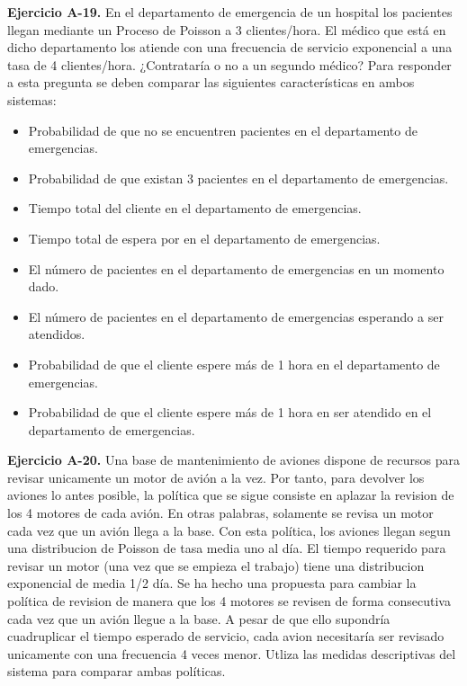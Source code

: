 \documentclass[
]{book}
\providecommand{\tightlist}{%
  \setlength{\itemsep}{0pt}\setlength{\parskip}{0pt}}
\theoremstyle{definition}
\theoremstyle{definition}
\theoremstyle{definition}
\theoremstyle{definition}
\theoremstyle{remark}
\begin{document}
\textbf{Ejercicio A-19.} En el departamento de emergencia de un hospital los pacientes llegan mediante un Proceso de Poisson a 3 clientes/hora. El médico que está en dicho departamento los atiende con una frecuencia de servicio exponencial a una tasa de 4 clientes/hora. ¿Contrataría o no a un segundo médico? Para responder a esta pregunta se deben comparar las siguientes características en ambos sistemas:

\begin{itemize}
\tightlist
\item
  Probabilidad de que no se encuentren pacientes en el departamento de emergencias.
\item
  Probabilidad de que existan 3 pacientes en el departamento de emergencias.
\item
  Tiempo total del cliente en el departamento de emergencias.
\item
  Tiempo total de espera por en el departamento de emergencias.
\item
  El número de pacientes en el departamento de emergencias en un momento dado.
\item
  El número de pacientes en el departamento de emergencias esperando a ser atendidos.
\item
  Probabilidad de que el cliente espere más de 1 hora en el departamento de emergencias.
\item
  Probabilidad de que el cliente espere más de 1 hora en ser atendido en el departamento de emergencias.
\end{itemize}

\textbf{Ejercicio A-20.} Una base de mantenimiento de aviones dispone de recursos para revisar unicamente un motor de avión a la vez. Por tanto, para devolver los aviones lo antes posible, la política que se sigue consiste en aplazar la revision de los 4 motores de cada avión. En otras palabras, solamente se revisa un
motor cada vez que un avión llega a la base. Con esta política, los aviones llegan segun una distribucion de Poisson de tasa media uno al día. El tiempo requerido para revisar un motor (una vez que se empieza el trabajo) tiene una distribucion exponencial de media 1/2 día. Se ha hecho una propuesta para cambiar la política de revision de manera que los 4 motores se revisen de forma consecutiva cada vez que un avión llegue a la base. A pesar de que ello supondría cuadruplicar el tiempo esperado de servicio, cada avion necesitaría ser revisado unicamente con una frecuencia 4 veces menor. Utliza las medidas descriptivas del sistema para comparar ambas políticas.
\end{document}
